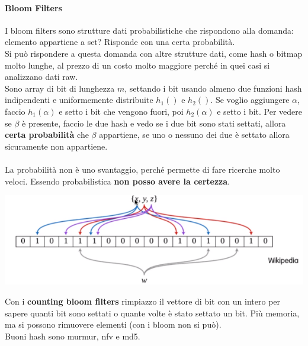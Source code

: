 \documentclass[10pt]{book}
\begin{document}
\paragraph{Bloom Filters} I bloom filters sono strutture dati probabilistiche che rispondono alla domanda: elemento appartiene a set? Risponde con una certa probabilità.\\
Si può rispondere a questa domanda con altre strutture dati, come hash o bitmap molto lunghe, al prezzo di un costo molto maggiore perché in quei casi si analizzano dati raw.\\
Sono array di bit di lunghezza $m$, settando i bit usando almeno due funzioni hash indipendenti e uniformemente distribuite $h_1()$ e $h_2()$. Se voglio aggiungere $\alpha$, faccio $h_1(\alpha)$ e setto i bit che vengono fuori, poi $h_2(\alpha)$ e setto i bit. Per vedere se $\beta$ è presente, faccio le due hash e vedo se i due bit sono stati settati, allora \textbf{certa probabilità} che $\beta$ appartiene, se uno o nessuno dei due è settato allora sicuramente non appartiene.\\\\
La probabilità non è uno svantaggio, perché permette di fare ricerche molto veloci. Essendo probabilistica \textbf{non posso avere la certezza}.
\begin{center}
	\includegraphics[scale=0.85]{bloomfilters.png}
\end{center}
Con i \textbf{counting bloom filters} rimpiazzo il vettore di bit con un intero per sapere quanti bit sono settati o quante volte è stato settato un bit. Più memoria, ma si possono rimuovere elementi (con i bloom non si può).\\
Buoni hash sono murmur, nfv e md5.
\end{document}
